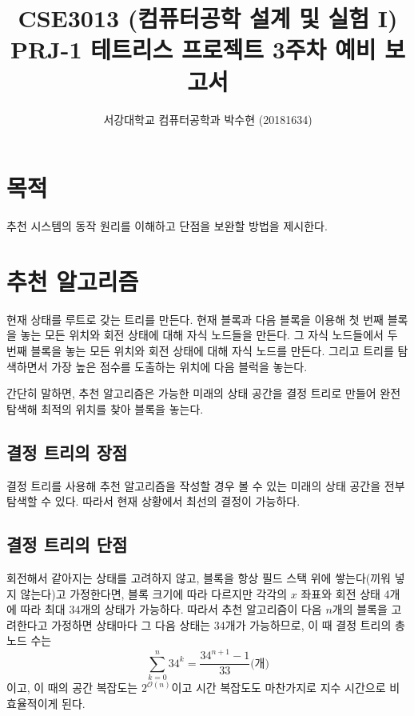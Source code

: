 
    
\usepackage{subfig}



\title{CSE3013 (컴퓨터공학 설계 및 실험 I) \space \newline PRJ-1 테트리스 프로젝트 3주차 예비 보고서}
\author{서강대학교 컴퓨터공학과 박수현 (20181634)}
\maketitle

\section{목적}
추천 시스템의 동작 원리를 이해하고 단점을 보완할 방법을 제시한다.

\section{추천 알고리즘}
현재 상태를 루트로 갖는 트리를 만든다. 현재 블록과 다음 블록을 이용해 첫 번째 블록을 놓는 모든 위치와 회전 상태에 대해 자식 노드들을 만든다.
그 자식 노드들에서 두 번째 블록을 놓는 모든 위치와 회전 상태에 대해 자식 노드를 만든다.
그리고 트리를 탐색하면서 가장 높은 점수를 도출하는 위치에 다음 블럭을 놓는다.

간단히 말하면, 추천 알고리즘은 가능한 미래의 상태 공간을 결정 트리로 만들어 완전 탐색해 최적의
위치를 찾아 블록을 놓는다.

\subsection{결정 트리의 장점}
결정 트리를 사용해 추천 알고리즘을 작성할 경우 볼 수 있는 미래의 상태 공간을 전부 탐색할 수 있다. 따라서 현재 상황에서 최선의 결정이 가능하다.

\subsection{결정 트리의 단점}
회전해서 같아지는 상태를 고려하지 않고, 블록을 항상 필드 스택 위에 쌓는다(끼워 넣지 않는다)고 가정한다면,
블록 크기에 따라 다르지만 각각의 $x$ 좌표와 회전 상태 4개에 따라 최대 34개의 상태가 가능하다. 따라서 추천 알고리즘이 다음 $n$개의 블록을 고려한다고 가정하면
상태마다 그 다음 상태는 34개가 가능하므로, 이 때 결정 트리의 총 노드 수는 \[\sum_{k=0}^{n} 34^k = \frac{34^{n+1} - 1}{33}\mbox{(개)}\]이고,
이 때의 공간 복잡도는 $2^{\mathcal{O}\left(n\right)}$이고 시간 복잡도도 마찬가지로 지수 시간으로 비효율적이게 된다.

